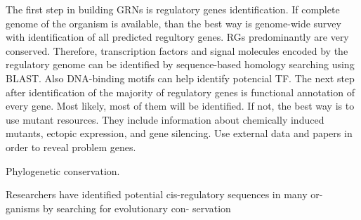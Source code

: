 \documentclass[a4paper, oneside]{report}
\begin{document}
The first step in building GRNs is regulatory genes identification.
If complete genome of the organism is available, than the best way is  genome-wide survey with identification of all predicted regultory genes.
RGs predominantly are very conserved.
Therefore, transcription factors and signal molecules encoded by the regulatory genome can be identified by sequence-based homology searching using BLAST. 
Also DNA-binding motifs can help identify potencial TF.
The next step after identification of the majority of regulatory genes is functional annotation of every gene.
Most likely, most of them will be identified.
If not, the best way is to use mutant resources.
They include information about chemically induced mutants, ectopic expression, and gene silencing.
Use external data and papers in order to reveal problem genes.


Phylogenetic conservation.

 Researchers have identified
potential cis-regulatory sequences in many or-
ganisms by searching for evolutionary con-
servation
\end{document}
